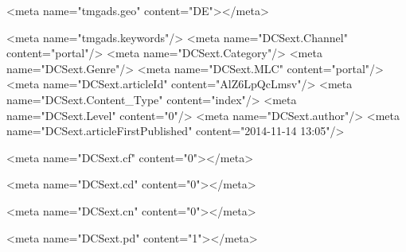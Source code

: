 {{{	
		<meta name="tmgads.geo" content="DE"></meta>
	
	
<meta name="tmgads.keywords"/>
<meta name="DCSext.Channel" content="portal"/>
<meta name="DCSext.Category"/>
<meta name="DCSext.Genre"/>
<meta name="DCSext.MLC" content="portal"/>
<meta name="DCSext.articleId" content="AlZ6LpQcLmsv"/>
<meta name="DCSext.Content_Type" content="index"/>
<meta name="DCSext.Level" content="0"/>
<meta name="DCSext.author"/>
<meta name="DCSext.articleFirstPublished" content="2014-11-14 13:05"/>

	
		<meta name="DCSext.cf" content="0"></meta>
	
	
	
		<meta name="DCSext.cd" content="0"></meta>
	
	
	
		<meta name="DCSext.cn" content="0"></meta>
	
	
	
		<meta name="DCSext.pd" content="1"></meta>
	
}}}

